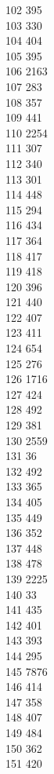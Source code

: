 { 102	395 \\
 103	330 \\
 104	404 \\
 105	395 \\
 106	2163 \\
 107	283 \\
 108	357 \\
 109	441 \\
 110	2254 \\
 111	307 \\
 112	340 \\
 113	301 \\
 114	448 \\
 115	294 \\
 116	434 \\
 117	364 \\
 118	417 \\
 119	418 \\
 120	396 \\
 121	440 \\
 122	407 \\
 123	411 \\
 124	654 \\
 125	276 \\
 126	1716 \\
 127	424 \\
 128	492 \\
 129	381 \\
 130	2559 \\
 131	36 \\
 132	492 \\
 133	365 \\
 134	405 \\
 135	449 \\
 136	352 \\
 137	448 \\
 138	478 \\
 139	2225 \\
 140	33 \\
 141	435 \\
 142	401 \\
 143	393 \\
 144	295 \\
 145	7876 \\
 146	414 \\
 147	358 \\
 148	407 \\
 149	484 \\
 150	362 \\
 151	420 \\
}
